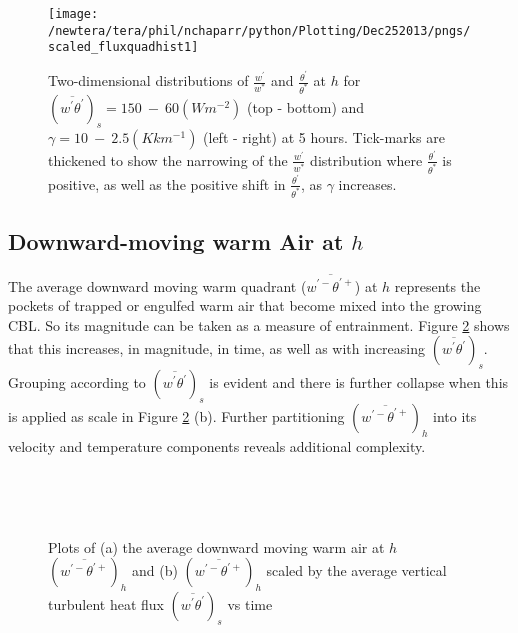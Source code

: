 \begin{figure}[htbp]
\centering
 \texttt{[image: /newtera/tera/phil/nchaparr/python/Plotting/Dec252013/pngs/scaled\_fluxquadhist1]}                 
\caption[Two-dimensional Distributions of $\frac{w^{'}}{w^{*}}$ and $\frac{\theta^{'}}{\theta^{*}}$ for all Runs]{Two-dimensional distributions of $\frac{w^{'}}{w^{*}}$ and $\frac{\theta^{'}}{\theta^{*}}$ at $h$ for $(\overline{w^{'}\theta^{'}})_{s} = 150 \ - \ 60 (Wm^{-2})$ (top - bottom) and $\gamma = 10 \ - \  2.5(Kkm^{-1})$ (left - right) at 5 hours. Tick-marks are thickened to show the narrowing of the $\frac{w^{'}}{w^{*}}$ distribution where $\frac{\theta^{'}}{\theta^{*}}$ is positive, as well as the positive shift in $\frac{\theta^{'}}{\theta^{*}}$, as $\gamma$ increases.}
\label{fig:scaled_fluxquadhs}
\end{figure}


\clearpage

\subsection{Downward-moving warm Air at $h$}
\label{subsec:downwarm}

The average downward moving warm quadrant ($\overline{w^{'-}\theta^{'+}}$) at $h$ represents the pockets of trapped or engulfed warm air that become mixed into the growing \acs{CBL}.  So its magnitude can be taken as a measure of entrainment.  Figure \ref{fig:downwarm} shows that this increases, in magnitude, in time, as well as with increasing $(\overline{w^{'}\theta^{'}})_{s}$.  Grouping according to $(\overline{w^{'}\theta^{'}})_{s}$ is evident and there is further collapse when this is applied as scale in Figure \ref{fig:downwarm} (b).  Further partitioning $(\overline{w^{'-}\theta^{'+}})_{h}$ into its velocity and temperature components reveals additional complexity.\\

\begin{figure}[htbp]
\begin{minipage}[b]{0.5\linewidth}
        \\
        \end{minipage}             
\quad
\begin{minipage}[b]{0.5\linewidth}
        \\
     
       \end{minipage}
        \caption[Downward-moving warm Air at $h$]{Plots of (a) the average downward moving warm air at $h$ $(\overline{w^{\prime-}\theta^{\prime+}})_{h}$ and (b) $(\overline{w^{\prime-}\theta^{\prime+}})_{h}$ scaled by the average vertical turbulent heat flux $ ( \overline{ w^{'} \theta^{'} } )_{s} $ vs time}
        \label{fig:downwarm}
\end{figure}

